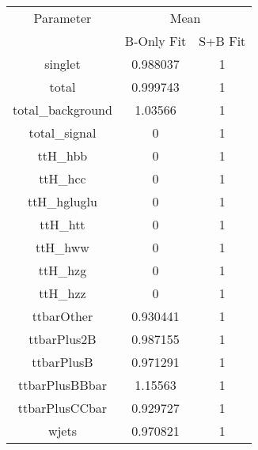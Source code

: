 \begin{table}
\centering

\begin{tabular}{ccc}
\toprule
Parameter & \multicolumn{2}{c}{Mean}\\
 & B-Only Fit & S+B Fit\\
\midrule
singlet & \num{0.988037} & \num{1}\\
total & \num{0.999743} & \num{1}\\
total\_background & \num{1.03566} & \num{1}\\
total\_signal & \num{0} & \num{1}\\
ttH\_hbb & \num{0} & \num{1}\\
ttH\_hcc & \num{0} & \num{1}\\
ttH\_hgluglu & \num{0} & \num{1}\\
ttH\_htt & \num{0} & \num{1}\\
ttH\_hww & \num{0} & \num{1}\\
ttH\_hzg & \num{0} & \num{1}\\
ttH\_hzz & \num{0} & \num{1}\\
ttbarOther & \num{0.930441} & \num{1}\\
ttbarPlus2B & \num{0.987155} & \num{1}\\
ttbarPlusB & \num{0.971291} & \num{1}\\
ttbarPlusBBbar & \num{1.15563} & \num{1}\\
ttbarPlusCCbar & \num{0.929727} & \num{1}\\
wjets & \num{0.970821} & \num{1}\\
\bottomrule
\end{tabular}
\end{table}